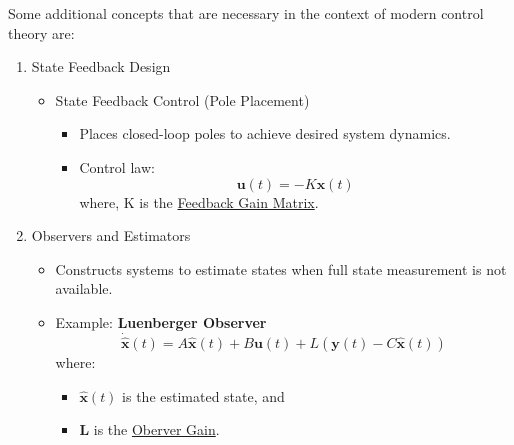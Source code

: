 \documentclass{article}
\begin{document}
Some additional concepts that are necessary in the context of modern control theory are:
\begin{enumerate}
    \item State Feedback Design
        \begin{itemize}
            \item State Feedback Control (Pole Placement)
            \begin{itemize}
                \item Places closed-loop poles to achieve desired system dynamics.
                \item Control law:
                    \[ \mathbf{u}(t) = -K\mathbf{x}(t) \]
                where, K is the \underline{Feedback Gain Matrix}.
            \end{itemize}
        \end{itemize}
    \item Observers and Estimators
        \begin{itemize}
            \item Constructs systems to estimate states when full state measurement is not available.
            \item Example: \textbf{Luenberger Observer}
                \[ \dot{\hat{\mathbf{x}}}(t) = A\hat{\mathbf{x}}(t) + B\mathbf{u}(t) + L(\mathbf{y}(t) - C\hat{\mathbf{x}}(t)) \]
                where:
                    \begin{itemize}
                        \item $\hat{\mathbf{x}}(t)$ is the estimated state, and
                        \item \textbf{L} is the \underline{Oberver Gain}. 
                    \end{itemize}
        \end{itemize}
\end{enumerate}
\end{document}
